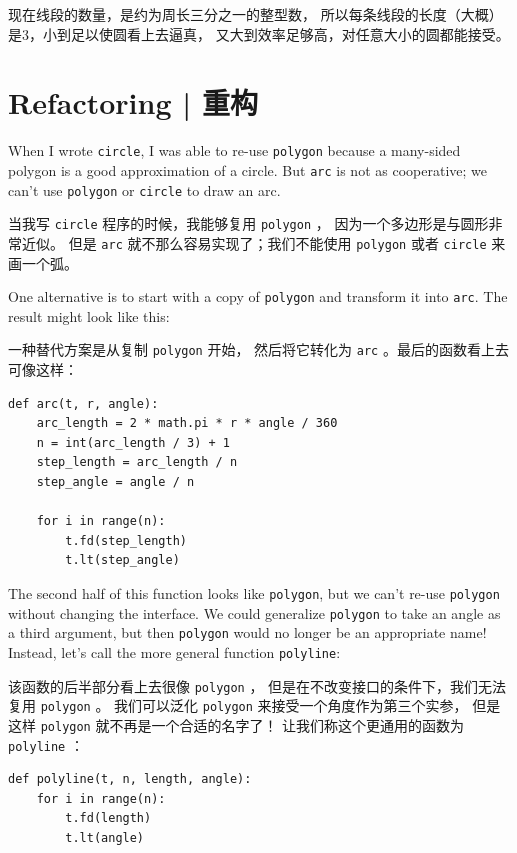 现在线段的数量，是约为周长三分之一的整型数，
所以每条线段的长度（大概）是3，小到足以使圆看上去逼真，
又大到效率足够高，对任意大小的圆都能接受。

\section{Refactoring  |  重构}
\label{refactoring}
  

When I wrote {\tt circle}, I was able to re-use {\tt polygon}
because a many-sided polygon is a good approximation of a circle.
But {\tt arc} is not as cooperative; we can't use {\tt polygon}
or {\tt circle} to draw an arc.

当我写 \lstinline{circle} 程序的时候，我能够复用 \lstinline{polygon} ，
因为一个多边形是与圆形非常近似。
但是 \lstinline{arc} 就不那么容易实现了；我们不能使用 \lstinline{polygon} 或者 \lstinline{circle} 来画一个弧。

One alternative is to start with a copy
of {\tt polygon} and transform it into {\tt arc}.  The result
might look like this:

一种替代方案是从复制 \lstinline{polygon} 开始，
然后将它转化为 \lstinline{arc} 。最后的函数看上去可像这样：

\begin{lstlisting}
def arc(t, r, angle):
    arc_length = 2 * math.pi * r * angle / 360
    n = int(arc_length / 3) + 1
    step_length = arc_length / n
    step_angle = angle / n

    for i in range(n):
        t.fd(step_length)
        t.lt(step_angle)
\end{lstlisting}

%
The second half of this function looks like {\tt polygon}, but we
can't re-use {\tt polygon} without changing the interface.  We could
generalize {\tt polygon} to take an angle as a third argument,
but then {\tt polygon} would no longer be an appropriate name!
Instead, let's call the more general function {\tt polyline}:

该函数的后半部分看上去很像 \lstinline{polygon} ，
但是在不改变接口的条件下，我们无法复用 \lstinline{polygon} 。
我们可以泛化 \lstinline{polygon} 来接受一个角度作为第三个实参， 但是这样 \lstinline{polygon} 就不再是一个合适的名字了！ 让我们称这个更通用的函数为 \lstinline{polyline} ：

\begin{lstlisting}
def polyline(t, n, length, angle):
    for i in range(n):
        t.fd(length)
        t.lt(angle)
\end{lstlisting}

